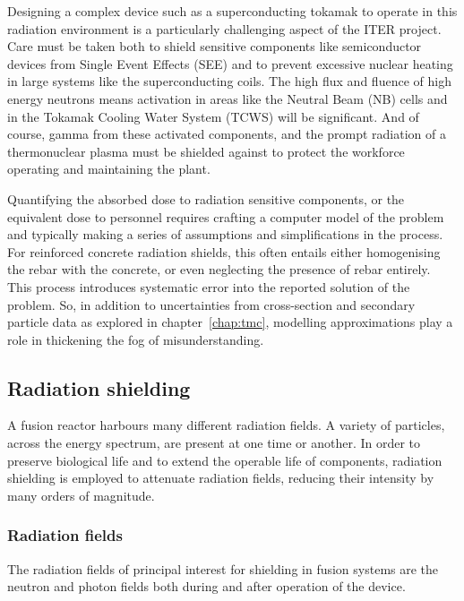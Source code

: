 Designing a complex device such as a superconducting tokamak to operate in this radiation environment is a particularly challenging aspect of the ITER project. Care must be taken both to shield sensitive components like semiconductor devices from Single Event Effects (SEE) and to prevent excessive nuclear heating in large systems like the superconducting coils. The high flux and fluence of high energy neutrons means activation in areas like the Neutral Beam (NB) cells and in the Tokamak Cooling Water System (TCWS) will be significant. And of course, gamma from these activated components, and the prompt radiation of a thermonuclear plasma must be shielded against to protect the workforce operating and maintaining the plant.

Quantifying the absorbed dose to radiation sensitive components, or the equivalent dose to personnel requires crafting a computer model of the problem and typically making a series of assumptions and simplifications in the process. For reinforced concrete radiation shields, this often entails either homogenising the rebar with the concrete, or even neglecting the presence of rebar entirely. This process introduces systematic error into the reported solution of the problem. So, in addition to uncertainties from cross-section and secondary particle data as explored in chapter~\ref{chap:tmc}, modelling approximations play a role in thickening the fog of misunderstanding. 

\subsection{Radiation shielding}
A fusion reactor harbours many different radiation fields. A variety of particles, across the energy spectrum, are present at one time or another. In order to preserve biological life and to extend the operable life of components, radiation shielding is employed to attenuate radiation fields, reducing their intensity by many orders of magnitude.

\subsubsection{Radiation fields}
The radiation fields of principal interest for shielding in fusion systems are the neutron and photon fields both during and after operation of the device.


